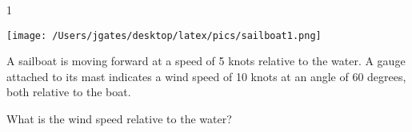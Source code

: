 
\AddToShipoutPicture*{\BackgroundPic}

\addtocounter {ProbNum} {1}

\begin{floatingfigure}[r]{.35\textwidth}
\texttt{[image: /Users/jgates/desktop/latex/pics/sailboat1.png]}
\end{floatingfigure}
 
{\bf \Large{}} A sailboat is moving forward at a speed of 5 knots relative to the water. A gauge attached to its mast indicates a wind speed of 10 knots at an angle of 60 degrees, both relative to the boat. 
\bigskip

\indent What is the wind speed relative to the water?

\vfill

\newpage
